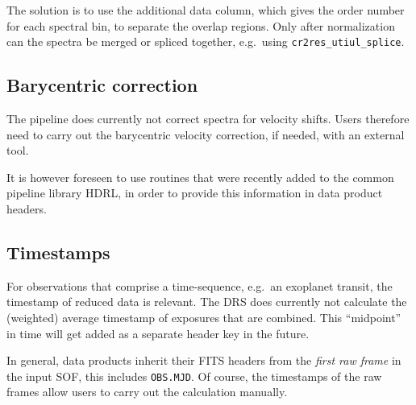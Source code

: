 The solution is to use the additional data column, which gives the order number
for each spectral bin, to separate the overlap regions. Only after normalization
can the spectra be merged or spliced together, e.g.~using
\verb!cr2res_utiul_splice!.

\subsection{Barycentric correction}

The pipeline does currently not correct spectra for velocity shifts. Users
therefore need to carry out the barycentric velocity correction, if needed, with
an external tool.

It is however foreseen to use routines that were recently added to the
common pipeline library HDRL, in order to provide this information in 
data product headers.

\subsection{Timestamps}
For observations that comprise a time-sequence, e.g.~an exoplanet transit,
the timestamp of reduced data is relevant. The DRS does currently not 
calculate the (weighted) average timestamp of exposures that are combined. This ``midpoint'' in time will get added as a separate header key in the future.

In general, data products inherit their FITS headers from the \emph{first raw frame} in the input SOF, this includes \texttt{OBS.MJD}. Of course, the timestamps of the raw frames allow users to carry out the calculation manually.